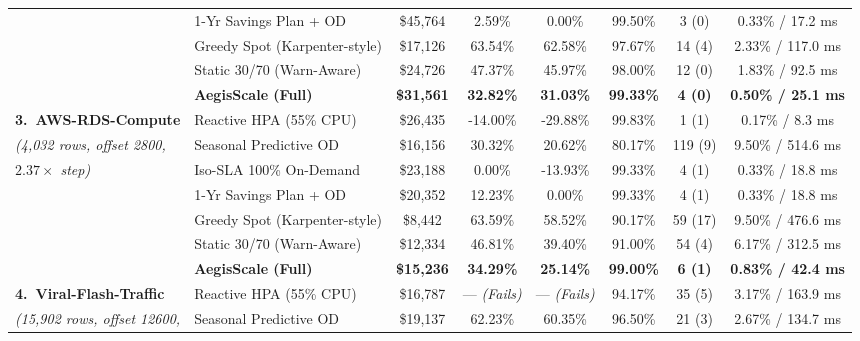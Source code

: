\documentclass[journal]{IEEEtran}
\begin{document}
\begin{table}[t]
{\begin{tabular}{llcccccc}
                                   & 1-Yr Savings Plan + OD        & \$45,764 & 2.59\%             & 0.00\%             & 99.50\% & 3 (0)    & 0.33\% / 17.2 ms \\
                                   & Greedy Spot (Karpenter-style) & \$17,126 & 63.54\%            & 62.58\%            & 97.67\% & 14 (4)   & 2.33\% / 117.0 ms \\
                                   & Static 30/70 (Warn-Aware)     & \$24,726 & 47.37\%            & 45.97\%            & 98.00\% & 12 (0)   & 1.83\% / 92.5 ms \\
                                   & \textbf{AegisScale (Full)}    & \textbf{\$31,561} & \textbf{32.82\%} & \textbf{31.03\%} & \textbf{99.33\%} & \textbf{4 (0)} & \textbf{0.50\% / 25.1 ms} \\
\hline
\textbf{3.\ AWS-RDS-Compute}       & Reactive HPA (55\% CPU)       & \$26,435 & -14.00\%           & -29.88\%           & 99.83\% & 1 (1)    & 0.17\% / 8.3 ms \\
\emph{(4,032 rows, offset 2800,}   & Seasonal Predictive OD        & \$16,156 & 30.32\%            & 20.62\%            & 80.17\% & 119 (9)  & 9.50\% / 514.6 ms \\
\emph{$2.37\times$ step)}          & Iso-SLA 100\% On-Demand       & \$23,188 & 0.00\%             & -13.93\%           & 99.33\% & 4 (1)    & 0.33\% / 18.8 ms \\
                                   & 1-Yr Savings Plan + OD        & \$20,352 & 12.23\%            & 0.00\%             & 99.33\% & 4 (1)    & 0.33\% / 18.8 ms \\
                                   & Greedy Spot (Karpenter-style) & \$8,442  & 63.59\%            & 58.52\%            & 90.17\% & 59 (17)  & 9.50\% / 476.6 ms \\
                                   & Static 30/70 (Warn-Aware)     & \$12,334 & 46.81\%            & 39.40\%            & 91.00\% & 54 (4)   & 6.17\% / 312.5 ms \\
                                   & \textbf{AegisScale (Full)}    & \textbf{\$15,236} & \textbf{34.29\%} & \textbf{25.14\%} & \textbf{99.00\%} & \textbf{6 (1)} & \textbf{0.83\% / 42.4 ms} \\
\hline
\textbf{4.\ Viral-Flash-Traffic}   & Reactive HPA (55\% CPU)       & \$16,787 & --- \emph{(Fails)} & --- \emph{(Fails)} & 94.17\% & 35 (5)   & 3.17\% / 163.9 ms \\
\emph{(15,902 rows, offset 12600,} & Seasonal Predictive OD        & \$19,137 & 62.23\%            & 60.35\%            & 96.50\% & 21 (3)   & 2.67\% / 134.7 ms \\

\end{tabular}}
\end{table}
\end{document}
